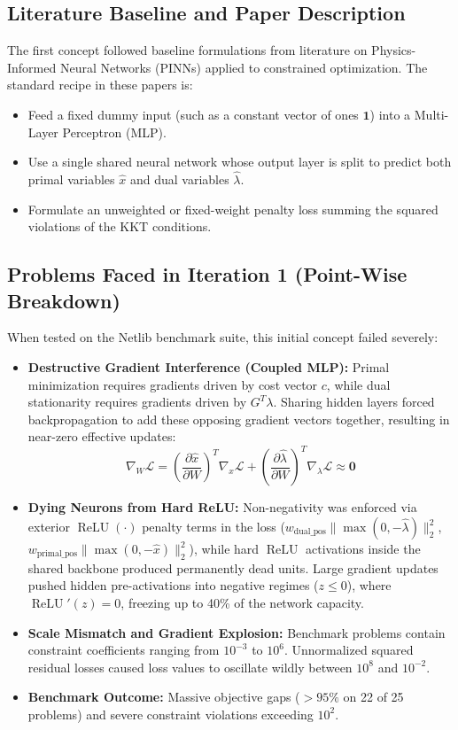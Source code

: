 \documentclass[11pt,a4paper]{article}
\begin{document}
\subsection{Literature Baseline and Paper Description}
The first concept followed baseline formulations from literature on Physics-Informed Neural Networks (PINNs) applied to constrained optimization. The standard recipe in these papers is:
\begin{itemize}[leftmargin=1.5em, itemsep=2pt]
    \item Feed a fixed dummy input (such as a constant vector of ones $\mathbf{1}$) into a Multi-Layer Perceptron (MLP).
    \item Use a single shared neural network whose output layer is split to predict both primal variables $\hat{x}$ and dual variables $\hat{\lambda}$.
    \item Formulate an unweighted or fixed-weight penalty loss summing the squared violations of the KKT conditions.
\end{itemize}

\subsection{Problems Faced in Iteration 1 (Point-Wise Breakdown)}
When tested on the Netlib benchmark suite, this initial concept failed severely:
\begin{itemize}[leftmargin=1.5em, itemsep=3pt]
    \item \textbf{Destructive Gradient Interference (Coupled MLP):} Primal minimization requires gradients driven by cost vector $c$, while dual stationarity requires gradients driven by $G^T \lambda$. Sharing hidden layers forced backpropagation to add these opposing gradient vectors together, resulting in near-zero effective updates:
    \begin{equation}
        \nabla_W \mathcal{L} = \left(\frac{\partial \hat{x}}{\partial W}\right)^T \nabla_x \mathcal{L} + \left(\frac{\partial \hat{\lambda}}{\partial W}\right)^T \nabla_\lambda \mathcal{L} \approx \mathbf{0}
    \end{equation}
    \item \textbf{Dying Neurons from Hard ReLU:} Non-negativity was enforced via exterior $\operatorname{ReLU}(\cdot)$ penalty terms in the loss ($w_{\text{dual\_pos}} \|\max(0, -\hat{\lambda})\|_2^2$, $w_{\text{primal\_pos}} \|\max(0, -\hat{x})\|_2^2$), while hard $\operatorname{ReLU}$ activations inside the shared backbone produced permanently dead units. Large gradient updates pushed hidden pre-activations into negative regimes ($z \le 0$), where $\operatorname{ReLU}'(z) = 0$, freezing up to 40\% of the network capacity.
    \item \textbf{Scale Mismatch and Gradient Explosion:} Benchmark problems contain constraint coefficients ranging from $10^{-3}$ to $10^6$. Unnormalized squared residual losses caused loss values to oscillate wildly between $10^8$ and $10^{-2}$.
    \item \textbf{Benchmark Outcome:} Massive objective gaps ($> 95\%$ on 22 of 25 problems) and severe constraint violations exceeding $10^2$.
\end{itemize}
\end{document}
